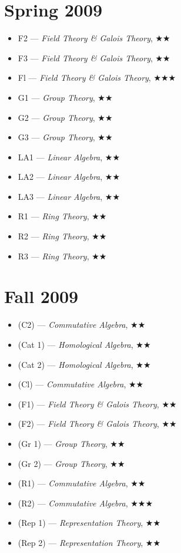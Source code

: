 \documentclass[11pt,letterpaper]{book}
\begin{document}
\section*{Spring 2009}
\begin{itemize}
\item F2 --- \textit{Field Theory \& Galois Theory}, $\bigstar\bigstar$
\item F3 --- \textit{Field Theory \& Galois Theory}, $\bigstar\bigstar$
\item Fl --- \textit{Field Theory \& Galois Theory}, $\bigstar\bigstar\bigstar$
\item G1 --- \textit{Group Theory}, $\bigstar\bigstar$
\item G2 --- \textit{Group Theory}, $\bigstar\bigstar$
\item G3 --- \textit{Group Theory}, $\bigstar\bigstar$
\item LA1 --- \textit{Linear Algebra}, $\bigstar\bigstar$
\item LA2 --- \textit{Linear Algebra}, $\bigstar\bigstar$
\item LA3 --- \textit{Linear Algebra}, $\bigstar\bigstar$
\item R1 --- \textit{Ring Theory}, $\bigstar\bigstar$
\item R2 --- \textit{Ring Theory}, $\bigstar\bigstar$
\item R3 --- \textit{Ring Theory}, $\bigstar\bigstar$
\end{itemize}

\section*{Fall 2009}
\begin{itemize}
\item (C2) --- \textit{Commutative Algebra}, $\bigstar\bigstar$
\item (Cat 1) --- \textit{Homological Algebra}, $\bigstar\bigstar$
\item (Cat 2) --- \textit{Homological Algebra}, $\bigstar\bigstar$
\item (Cl) --- \textit{Commutative Algebra}, $\bigstar\bigstar$
\item (F1) --- \textit{Field Theory \& Galois Theory}, $\bigstar\bigstar$
\item (F2) --- \textit{Field Theory \& Galois Theory}, $\bigstar\bigstar$
\item (Gr 1) --- \textit{Group Theory}, $\bigstar\bigstar$
\item (Gr 2) --- \textit{Group Theory}, $\bigstar\bigstar$
\item (R1) --- \textit{Commutative Algebra}, $\bigstar\bigstar$
\item (R2) --- \textit{Commutative Algebra}, $\bigstar\bigstar\bigstar$
\item (Rep 1) --- \textit{Representation Theory}, $\bigstar\bigstar$
\item (Rep 2) --- \textit{Representation Theory}, $\bigstar\bigstar$
\end{itemize}
\end{document}
